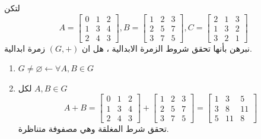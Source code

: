 \begin{example}
	لتكن 
	\[
	A = 
	\begin{bmatrix}
		0&1&2\\
		1&3&4\\
		2&4&3
	\end{bmatrix},
	B = 
	\begin{bmatrix}
		1&2&3\\
		2&5&7\\
		3&7&5
	\end{bmatrix},
	C = 
	\begin{bmatrix}
		2&1&3\\
		1&3&2\\
		3&2&1
	\end{bmatrix}
	\]
	نبرهن بأنها تحقق شروط الزمرة الابدالية ، هل ان $(G, +)$ زمرة ابدالية.
	\begin{enumerate}[label=\textbf{\xslalph*)}, leftmargin=*]
		\item $G\neq \varnothing \leftarrow \forall A, B\in G$  
		\item لكل $A, B\in G$
		\[
		A + B = 
		\begin{bmatrix}
			0&1&2\\
			1&3&4\\
			2&4&3
		\end{bmatrix} + 
		\begin{bmatrix}
			1&2&3\\
			2&5&7\\
			3&7&5
		\end{bmatrix}= 
		\begin{bmatrix}
			1&3&5\\
			3&8&11\\
			5&11&8
		\end{bmatrix}
		\]
		تحقق شرط المغلقة وهي مصفوفة متناظرة.
		

\end{enumerate}
\end{example}
